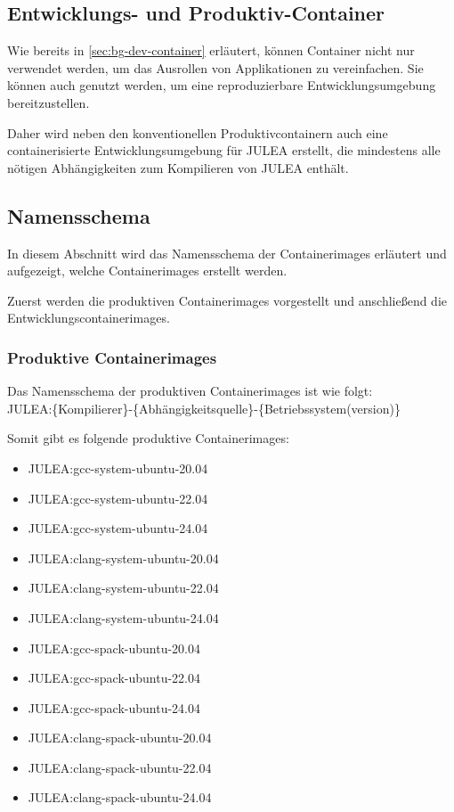 \subsection{Entwicklungs- und Produktiv-Container}

Wie bereits in \cref{sec:bg-dev-container} erläutert, können Container nicht nur verwendet werden, um das Ausrollen von Applikationen zu vereinfachen. Sie können auch genutzt werden, um eine reproduzierbare Entwicklungsumgebung bereitzustellen. 

Daher wird neben den konventionellen Produktivcontainern auch eine containerisierte Entwicklungsumgebung für JULEA erstellt, die mindestens alle nötigen Abhängigkeiten zum Kompilieren von JULEA enthält.

\subsection{Namensschema} \label{sec:namensschema}

In diesem Abschnitt wird das Namensschema der Containerimages erläutert und aufgezeigt, welche Containerimages erstellt werden. 

Zuerst werden die produktiven Containerimages vorgestellt und anschließend die Entwicklungscontainerimages. 

\subsubsection{Produktive Containerimages}

Das Namensschema der produktiven Containerimages ist wie folgt: \\
JULEA:\{Kompilierer\}-\{Abhängigkeitsquelle\}-\{Betriebssystem(version)\}

Somit gibt es folgende produktive Containerimages:

\begin{multicols}{2}
    \begin{itemize}
        \item JULEA:gcc-system-ubuntu-20.04  
        \item JULEA:gcc-system-ubuntu-22.04  
        \item JULEA:gcc-system-ubuntu-24.04  
        \item JULEA:clang-system-ubuntu-20.04
        \item JULEA:clang-system-ubuntu-22.04
        \item JULEA:clang-system-ubuntu-24.04
        \item JULEA:gcc-spack-ubuntu-20.04   
        \item JULEA:gcc-spack-ubuntu-22.04   
        \item JULEA:gcc-spack-ubuntu-24.04   
        \item JULEA:clang-spack-ubuntu-20.04 
        \item JULEA:clang-spack-ubuntu-22.04 
        \item JULEA:clang-spack-ubuntu-24.04 
    \end{itemize} 
\end{multicols}

